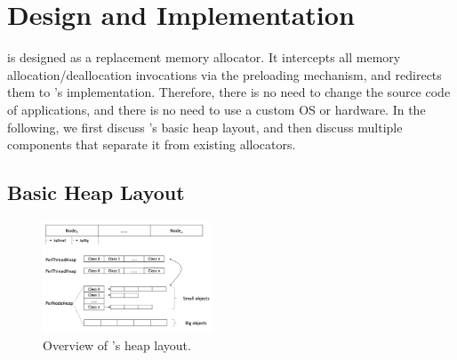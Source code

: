 \section{Design and Implementation}
\label{sec:implement}

\NM{} is designed as a replacement memory allocator. It intercepts all memory allocation/deallocation invocations via the preloading mechanism, and redirects them to \NM{}'s implementation. Therefore, there is no need to change the source code of applications, and there is no need to use a custom OS or hardware. In the following, we first discuss \NM{}'s basic heap layout, and then discuss multiple components that separate it from existing allocators.

\subsection{Basic Heap Layout}
\label{sec:overview}

\begin{figure}[!ht]
\begin{center}
\includegraphics[width=0.45\textwidth]{figure/numalloc-overview.png}
\end{center}
\caption{Overview of \NA{}'s heap layout.
\label{fig:overview}}
\end{figure}


